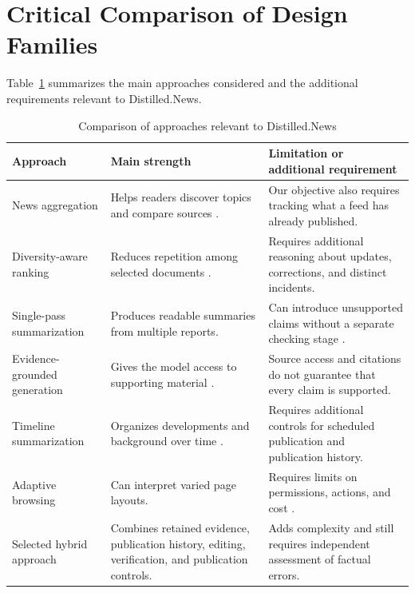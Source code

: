 \section{Critical Comparison of Design Families}

Table~\ref{tab:litcomparison} summarizes the main approaches considered and the additional requirements relevant to Distilled.News.

\begin{table}[htbp]
\small
\centering
\caption{Comparison of approaches relevant to Distilled.News}
\label{tab:litcomparison}
\begin{tabularx}{\linewidth}{p{2.7cm}XX}
\toprule
Approach & Main strength & Limitation or additional requirement \\
\midrule

News aggregation
& Helps readers discover topics and compare sources \cite{googlenews}.
& Our objective also requires tracking what a feed has already published. \\

Diversity-aware ranking
& Reduces repetition among selected documents \cite{carbonell1998}.
& Requires additional reasoning about updates, corrections, and distinct incidents. \\

Single-pass summarization
& Produces readable summaries from multiple reports.
& Can introduce unsupported claims without a separate checking stage \cite{maynez2020}. \\

Evidence-grounded generation
& Gives the model access to supporting material \cite{lewis2020}.
& Source access and citations do not guarantee that every claim is supported. \\

Timeline summarization
& Organizes developments and background over time \cite{ghalandari2020,li2021,pratapa2023}.
& Requires additional controls for scheduled publication and publication history. \\

Adaptive browsing
& Can interpret varied page layouts.
& Requires limits on permissions, actions, and cost \cite{owasp2025}. \\

Selected hybrid approach
& Combines retained evidence, publication history, editing, verification, and publication controls.
& Adds complexity and still requires independent assessment of factual errors. \\

\bottomrule
\end{tabularx}
\end{table}

